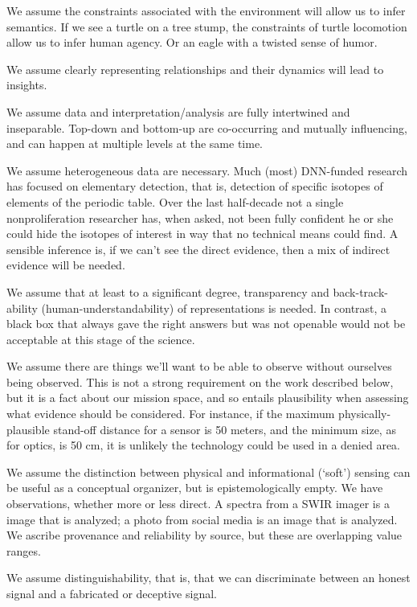 \documentclass{article} %
\begin{document}
We assume the constraints associated with the environment will allow us to infer semantics. If we see a turtle on a tree stump, the constraints of turtle locomotion allow us to infer human agency. Or an eagle with a twisted sense of humor.

We assume clearly representing relationships and their dynamics will lead to insights.

We assume data and interpretation/analysis are fully intertwined and inseparable. Top-down and bottom-up are co-occurring and mutually influencing, and can happen at multiple levels at the same time.

We assume heterogeneous data are necessary. Much (most) DNN-funded research has focused on elementary detection, that is, detection of specific isotopes of elements of the periodic table. Over the last half-decade not a single nonproliferation researcher has, when asked, not been fully confident he or she could hide the isotopes of interest in way that no technical means could find. A sensible inference is, if we can't see the direct evidence, then a mix of indirect evidence will be needed. 

We assume that at least to a significant degree, transparency and back-track-ability (human-understandability) of representations is needed. In contrast, a black box that always gave the right answers but was not openable would not be acceptable at this stage of the science.

We assume there are things we'll want to be able to observe without ourselves being observed. This is not a strong requirement on the work described below, but it is a fact about our mission space, and so entails plausibility when assessing what evidence should be considered. For instance, if the maximum physically-plausible stand-off distance for a sensor is 50 meters, and the minimum size, as for optics, is 50 cm, it is unlikely the technology could be used in a denied area. 

We assume the distinction between physical and informational (`soft') sensing can be useful as a conceptual organizer, but is epistemologically empty. We have observations, whether more or less direct. A spectra from a SWIR imager is a image that is analyzed; a photo from social media is an image that is analyzed. We ascribe provenance and reliability by source, but these are overlapping value ranges.

We assume distinguishability, that is, that we can discriminate between an honest signal and a fabricated or deceptive signal. 
\end{document}

